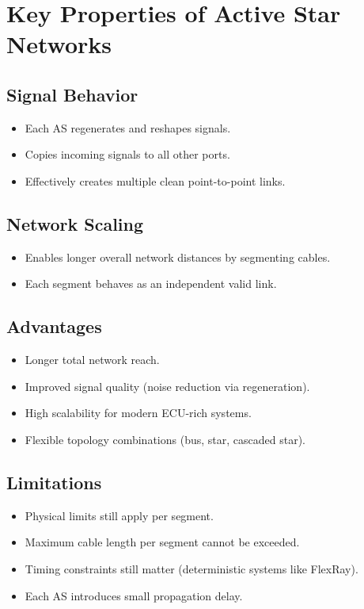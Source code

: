 \section*{Key Properties of Active Star Networks}

\subsection*{Signal Behavior}
\begin{itemize}
    \item Each AS regenerates and reshapes signals.
    \item Copies incoming signals to all other ports.
    \item Effectively creates multiple clean point-to-point links.
\end{itemize}

\subsection*{Network Scaling}
\begin{itemize}
    \item Enables longer overall network distances by segmenting cables.
    \item Each segment behaves as an independent valid link.
\end{itemize}

\subsection*{Advantages}
\begin{itemize}
    \item Longer total network reach.
    \item Improved signal quality (noise reduction via regeneration).
    \item High scalability for modern ECU-rich systems.
    \item Flexible topology combinations (bus, star, cascaded star).
\end{itemize}

\subsection*{Limitations}
\begin{itemize}
    \item Physical limits still apply per segment.
    \item Maximum cable length per segment cannot be exceeded.
    \item Timing constraints still matter (deterministic systems like FlexRay).
    \item Each AS introduces small propagation delay.
\end{itemize}


